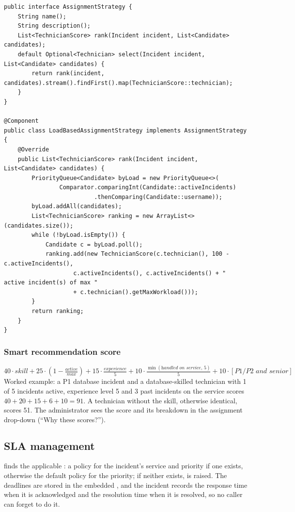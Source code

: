 \begin{lstlisting}[caption={The assignment contract and the load-based strategy}]
public interface AssignmentStrategy {
    String name();
    String description();
    List<TechnicianScore> rank(Incident incident, List<Candidate> candidates);
    default Optional<Technician> select(Incident incident, List<Candidate> candidates) {
        return rank(incident, candidates).stream().findFirst().map(TechnicianScore::technician);
    }
}

@Component
public class LoadBasedAssignmentStrategy implements AssignmentStrategy {
    @Override
    public List<TechnicianScore> rank(Incident incident, List<Candidate> candidates) {
        PriorityQueue<Candidate> byLoad = new PriorityQueue<>(
                Comparator.comparingInt(Candidate::activeIncidents)
                          .thenComparing(Candidate::username));
        byLoad.addAll(candidates);
        List<TechnicianScore> ranking = new ArrayList<>(candidates.size());
        while (!byLoad.isEmpty()) {
            Candidate c = byLoad.poll();
            ranking.add(new TechnicianScore(c.technician(), 100 - c.activeIncidents(),
                    c.activeIncidents(), c.activeIncidents() + " active incident(s) of max "
                    + c.technician().getMaxWorkload()));
        }
        return ranking;
    }
}
\end{lstlisting}

\subsubsection*{Smart recommendation score}
\[ 40 \cdot \textit{skill} + 25 \cdot (1 - \tfrac{\textit{active}}{\textit{max}}) + 15 \cdot \tfrac{\textit{experience}}{5} + 10 \cdot \tfrac{\min(\textit{handled on service},\,5)}{5} + 10 \cdot [\textit{P1/P2 and senior}] \]
Worked example: a P1 database incident and a database-skilled technician with 1 of 5 incidents active, experience level 5 and 3 past incidents on the service scores $40 + 20 + 15 + 6 + 10 = 91$. A technician without the skill, otherwise identical, scores 51. The administrator sees the score and its breakdown in the assignment drop-down (``Why these scores?'').

\subsection{SLA management}
 finds the applicable : a policy for the incident's service and priority if one exists, otherwise the default policy for the priority; if neither exists,  is raised. The deadlines are stored in the embedded , and the incident records the response time when it is acknowledged and the resolution time when it is resolved, so no caller can forget to do it.

